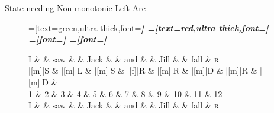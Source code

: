 \documentclass{lecture}
\begin{document}
\begin{plain}{State needing Non-monotonic Left-Arc}


\begin{figure}
    \centering
    \begin{dependency}[theme=simple]
        =[text=green,ultra thick,font=\bfseries\itshape]
        =[text=red,ultra thick,font=\bfseries\itshape]
        =[font=\bfseries\itshape]
        =[font=\itshape]

        \begin{deptext}[column sep=.075cm, row sep=.1ex]
            I \&           \& saw \&          \& Jack       \& \& and     \&           \& Jill   \&  \& fall \& \textsc{r} \\
|[m]|S \& |[m]|L \& |[m]|S   \& |[f]|R \& |[m]|R \& |[m]|D \& |[m]|R \& |[m]|D \& \\

    1 \&     2       \& 3  \&   4      \& 5          \& 6 \& 7     \& 8 \& 9 \& 10 \& 11 \& 12 \\
    I \&           \& saw \&          \& Jack       \& \& and     \&           \& Jill   \&      \& fall \& \textsc{r} \\
        \end{deptext}
    
\end{dependency}
\end{figure}
\end{plain}
\end{document}

